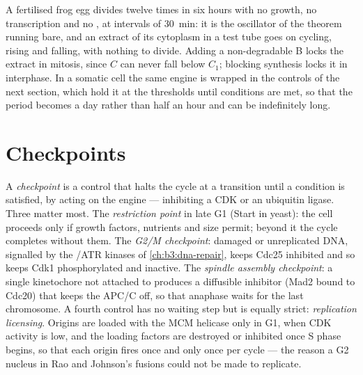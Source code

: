 \begin{example}\label{ex:b3:cell-cycle-apoptosis:frog}
A fertilised frog egg divides twelve times in six hours with no
growth, no transcription and no , at intervals of
\qty{30}{min}: it is the oscillator of the theorem running bare, and an
extract of its cytoplasm in a test tube goes on cycling,  rising
and falling, with nothing to divide. Adding a non-degradable  B
locks the extract in mitosis, since $C$ can never fall below $C_{1}$;
blocking  synthesis locks it in interphase. In a somatic cell the
same engine is wrapped in the controls of the next section, which hold
it at the thresholds until conditions are met, so that the period
becomes a day rather than half an hour and can be indefinitely long.
\end{example}

\section{Checkpoints}

\begin{definition}[Checkpoints]\label{def:b3:cell-cycle-apoptosis:checkpoints}
A \emph{checkpoint} is a control that halts the cycle at a transition
until a condition is satisfied, by acting on the engine --- inhibiting
a CDK or an ubiquitin ligase. Three matter most. The \emph{restriction
point} in late G1 (Start in yeast): the cell proceeds only if growth
factors, nutrients and size permit; beyond it the cycle completes
without them. The \emph{G2/M checkpoint}: damaged or unreplicated DNA,
signalled by the /ATR kinases of \cref{ch:b3:dna-repair}, keeps
Cdc25 inhibited and so keeps Cdk1 phosphorylated and inactive. The
\emph{spindle assembly checkpoint}: a single kinetochore not attached
to  produces a diffusible inhibitor (Mad2 bound to Cdc20)
that keeps the APC/C off, so that anaphase waits for the last
chromosome. A fourth control has no waiting step but is equally
strict: \emph{replication licensing}. Origins are loaded with the MCM
helicase only in G1, when CDK activity is low, and the loading factors
are destroyed or inhibited once S phase begins, so that each origin
fires once and only once per cycle --- the reason a G2 nucleus in Rao
and Johnson's fusions could not be made to replicate.
\end{definition}


